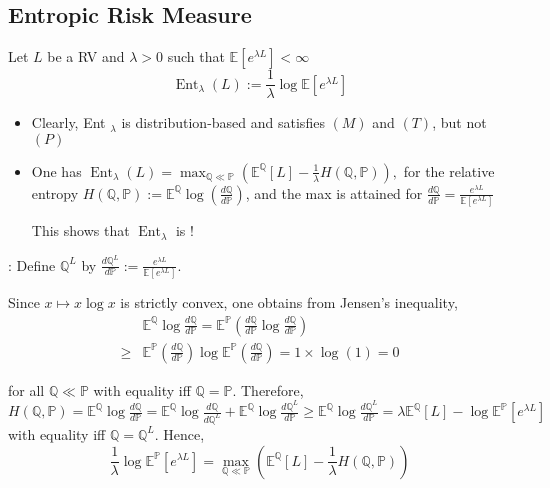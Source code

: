 \subsection*{Entropic Risk Measure}
Let $L$ be a RV and $\lambda>0$ such that $\mathbb{E}\left[e^{\lambda L}\right]<\infty$
$$
\operatorname{Ent}_{\lambda}(L):=\frac{1}{\lambda} \log \mathbb{E}\left[e^{\lambda L}\right]
$$
\begin{itemize}[leftmargin=*]
    \item Clearly, Ent ${ }_{\lambda}$ is distribution-based and satisfies $(M)$ and $(T)$, but not $(P)$
    \item One has
$
\operatorname{Ent}_{\lambda}(L)=\max _{\mathbb{Q} \ll \mathbb{P}}\left(\mathbb{E}^{\mathbb{Q}}[L]-\frac{1}{\lambda} H(\mathbb{Q}, \mathbb{P})\right),
$  for the relative entropy $H(\mathbb{Q}, \mathbb{P}):=\mathbb{E}^{\mathbb{Q}} \log \left(\frac{d \mathbb{Q}}{d \mathbb{P}}\right)$, and the max is attained for
$
\frac{d \mathbb{Q}}{d \mathbb{P}}=\frac{e^{\lambda L}}{\mathbb{E}\left[e^{\lambda L}\right]}
$

This shows that $\operatorname{Ent}_{\lambda}$ is !
\end{itemize}

: Define $\mathbb{Q}^{L}$ by
$
\frac{d \mathbb{Q}^{L}}{d \mathbb{P}}:=\frac{e^{\lambda L}}{\mathbb{E}\left[e^{\lambda L}\right]} .
$

Since $x \mapsto x \log x$ is strictly convex, one obtains from Jensen's inequality,
$$
\begin{aligned}
&\mathbb{E}^{\mathbb{Q}} \log \frac{d \mathbb{Q}}{d \mathbb{P}}=\mathbb{E}^{\mathbb{P}}\left(\frac{d \mathbb{Q}}{d \mathbb{P}} \log \frac{d \mathbb{Q}}{d \mathbb{P}}\right) \\
\geq& \mathbb{E}^{\mathbb{P}}\left(\frac{d \mathbb{Q}}{d \mathbb{P}}\right) \log \mathbb{E}^{\mathbb{P}}\left(\frac{d \mathbb{Q}}{d \mathbb{P}}\right)=1 \times \log (1)=0
\end{aligned}
$$

for all $\mathbb{Q} \ll \mathbb{P}$ with equality iff $\mathbb{Q}=\mathbb{P}$. Therefore,
$
H(\mathbb{Q}, \mathbb{P})=\mathbb{E}^{\mathbb{Q}} \log \frac{d \mathbb{Q}}{d \mathbb{P}}=\mathbb{E}^{\mathbb{Q}} \log \frac{d \mathbb{Q}}{d \mathbb{Q}^{L}}+\mathbb{E}^{\mathbb{Q}} \log \frac{d \mathbb{Q}^{L}}{d \mathbb{P}}
\geq \mathbb{E}^{\mathbb{Q}} \log \frac{d \mathbb{Q}^{L}}{d \mathbb{P}}=\lambda \mathbb{E}^{\mathbb{Q}}[L]-\log \mathbb{E}^{\mathbb{P}}\left[e^{\lambda L}\right]
$
with equality iff $\mathbb{Q}=\mathbb{Q}^{L}$. Hence,
$$
\frac{1}{\lambda} \log \mathbb{E}^{\mathbb{P}}\left[e^{\lambda L}\right]=\max _{\mathbb{Q} \ll \mathbb{P}}\left(\mathbb{E}^{\mathbb{Q}}[L]-\frac{1}{\lambda} H(\mathbb{Q}, \mathbb{P})\right)
$$
